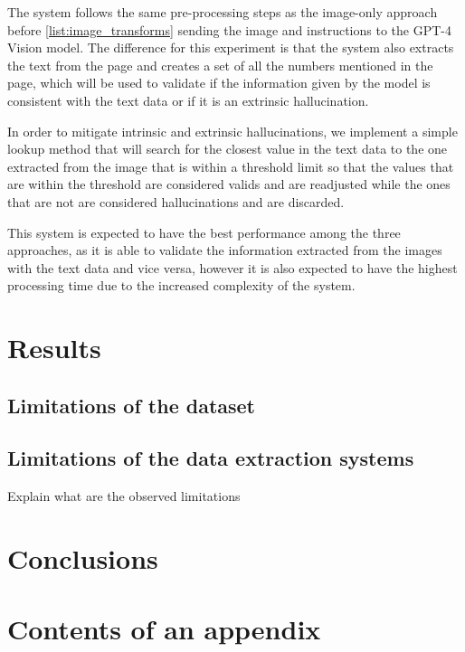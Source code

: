 \documentclass[english, 12pt, a4paper, elec, utf8, a-2b, online]{aaltothesis}
\begin{document}
The system follows the same pre-processing steps as the image-only approach before \ref{list:image_transforms} sending the image and instructions to the \ac{GPT}-4 Vision model.
The difference for this experiment is that the system also extracts the text from the page and creates a set of all the numbers mentioned in the page, which will be used to validate if the information given by the model is consistent with the text data or if it is an extrinsic hallucination.

In order to mitigate intrinsic and extrinsic hallucinations, we implement a simple lookup method that will search for the closest value in the text data to the one extracted from the image that is within a threshold limit so that the values that are within the threshold are considered valids and are readjusted while the ones that are not are considered hallucinations and are discarded.

This system is expected to have the best performance among the three approaches, as it is able to validate the information extracted from the images with the text data and vice versa, however it is also expected to have the highest processing time due to the increased complexity of the system.

\clearpage
\section{Results}


\subsection{Limitations of the dataset}

\subsection{Limitations of the data extraction systems}

Explain what are the observed limitations

\clearpage

\section{Conclusions}
\label{sec:summary}


\clearpage
\thesisbibliography




\clearpage

\thesisappendix

\section{Contents of an appendix}
\label{app:contents}
\end{document}
